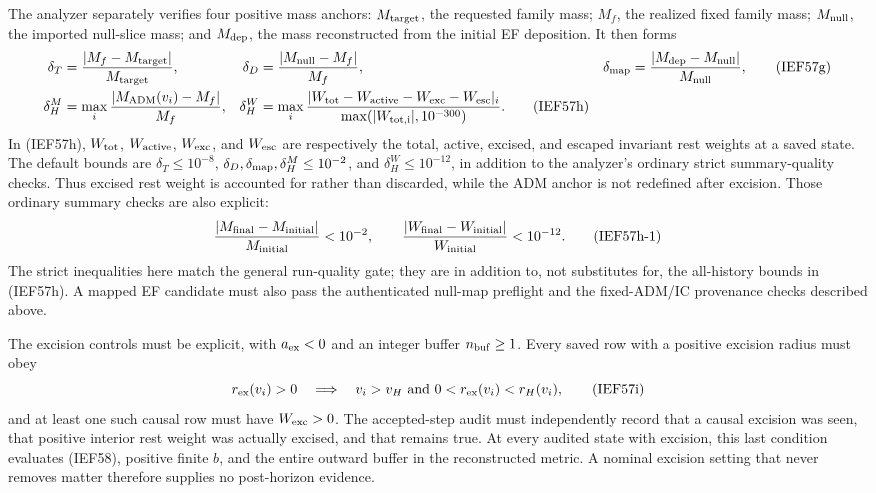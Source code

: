 The analyzer separately verifies four positive mass anchors:
\(M_{\rm target}\), the requested family mass; \(M_f\), the realized fixed
family mass; \(M_{\rm null}\), the imported null-slice mass; and
\(M_{\rm dep}\), the mass reconstructed from the initial EF deposition.  It
then forms
\begin{align}
 \delta_T&=\frac{|M_f-M_{\rm target}|}{M_{\rm target}},&
 \delta_D&=\frac{|M_{\rm null}-M_f|}{M_f},&
 \delta_{\rm map}&=\frac{|M_{\rm dep}-M_{\rm null}|}{M_{\rm null}},
                                                               \tag{IEF57g}\\
 \delta_H^M&=\max_i\frac{|M_{\rm ADM}(v_i)-M_f|}{M_f},&
 \delta_H^W&=\max_i
 \frac{|W_{\rm tot}-W_{\rm active}-W_{\rm exc}-W_{\rm esc}|_i}
      {\max(|W_{\rm tot,i}|,10^{-300})}.              \tag{IEF57h}
\end{align}
In (IEF57h), \(W_{\rm tot}\), \(W_{\rm active}\), \(W_{\rm exc}\), and
\(W_{\rm esc}\) are respectively the total, active, excised, and escaped
invariant rest weights at a saved state.
The default bounds are
\(\delta_T\le10^{-8}\),
\(\delta_D,\delta_{\rm map},\delta_H^M\le10^{-2}\), and
\(\delta_H^W\le10^{-12}\), in addition to the analyzer's ordinary strict
summary-quality checks.  Thus excised rest weight is accounted for rather
than discarded, while the ADM anchor is not redefined after excision.
Those ordinary summary checks are also explicit:
\[
 \frac{|M_{\rm final}-M_{\rm initial}|}{M_{\rm initial}}<10^{-2},
 \qquad
 \frac{|W_{\rm final}-W_{\rm initial}|}{W_{\rm initial}}<10^{-12}.
                                                               \tag{IEF57h-1}
\]
The strict inequalities here match the general run-quality gate; they are in
addition to, not substitutes for, the all-history bounds in (IEF57h).  A
mapped EF candidate must also pass the authenticated null-map preflight and
the fixed-ADM/IC provenance checks described above.

The excision controls must be explicit, with
\(a_{\rm ex}<0\) and an integer buffer \(n_{\rm buf}\ge1\).  Every saved row
with a positive excision radius must obey
\[
 r_{\rm ex}(v_i)>0\quad\Longrightarrow\quad
 v_i>v_H\ \hbox{and}\ 0<r_{\rm ex}(v_i)<r_H(v_i),    \tag{IEF57i}
\]
and at least one such causal row must have \(W_{\rm exc}>0\).  The
accepted-step audit must independently record that a causal excision was
seen, that positive interior rest weight was actually excised, and that
 remains true.  At every audited
state with excision, this last condition evaluates (IEF58), positive finite
\(b\), and the entire outward buffer in the reconstructed metric.  A nominal
excision setting that never removes matter therefore supplies no
post-horizon evidence.

